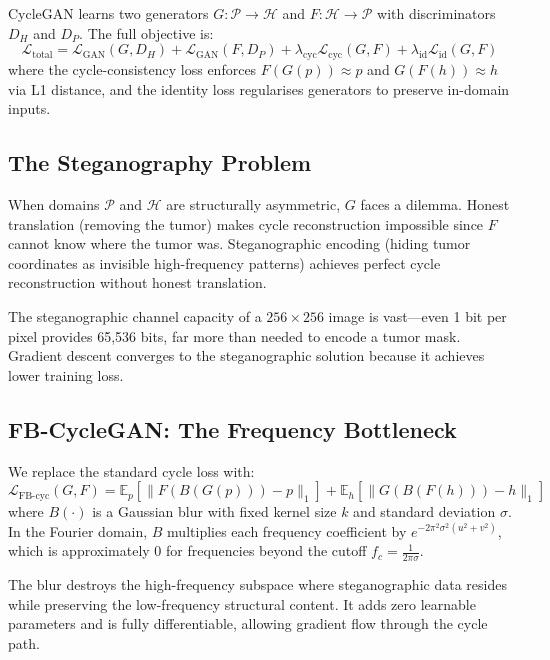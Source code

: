 \documentclass[11pt,a4paper]{article}
\theoremstyle{definition}
\begin{document}
CycleGAN learns two generators $G: \mathcal{P} \to \mathcal{H}$ and $F: \mathcal{H} \to \mathcal{P}$ with discriminators $D_H$ and $D_P$. The full objective is:
\begin{equation}
    \mathcal{L}_{\text{total}} = \mathcal{L}_{\text{GAN}}(G, D_H) + \mathcal{L}_{\text{GAN}}(F, D_P) + \lambda_{\text{cyc}} \mathcal{L}_{\text{cyc}}(G, F) + \lambda_{\text{id}} \mathcal{L}_{\text{id}}(G, F)
\end{equation}
where the cycle-consistency loss enforces $F(G(p)) \approx p$ and $G(F(h)) \approx h$ via L1 distance, and the identity loss regularises generators to preserve in-domain inputs.

\subsection{The Steganography Problem}

When domains $\mathcal{P}$ and $\mathcal{H}$ are structurally asymmetric, $G$ faces a dilemma. Honest translation (removing the tumor) makes cycle reconstruction impossible since $F$ cannot know where the tumor was. Steganographic encoding (hiding tumor coordinates as invisible high-frequency patterns) achieves perfect cycle reconstruction without honest translation.

The steganographic channel capacity of a $256 \times 256$ image is vast---even 1 bit per pixel provides 65,536 bits, far more than needed to encode a tumor mask. Gradient descent converges to the steganographic solution because it achieves lower training loss.

\subsection{FB-CycleGAN: The Frequency Bottleneck}

We replace the standard cycle loss with:
\begin{equation}
    \mathcal{L}_{\text{FB-cyc}}(G, F) = \mathbb{E}_p\left[\|F(B(G(p))) - p\|_1\right] + \mathbb{E}_h\left[\|G(B(F(h))) - h\|_1\right]
\end{equation}
where $B(\cdot)$ is a Gaussian blur with fixed kernel size $k$ and standard deviation $\sigma$. In the Fourier domain, $B$ multiplies each frequency coefficient by $e^{-2\pi^2\sigma^2(u^2+v^2)}$, which is approximately 0 for frequencies beyond the cutoff $f_c = \frac{1}{2\pi\sigma}$.

The blur destroys the high-frequency subspace where steganographic data resides while preserving the low-frequency structural content. It adds zero learnable parameters and is fully differentiable, allowing gradient flow through the cycle path.
\end{document}
